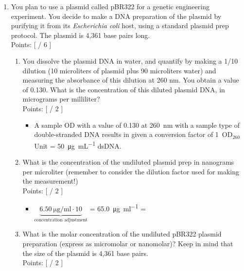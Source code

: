 \documentclass[basic]{inVerba-notes}
\begin{document}
\begin{enumerate}\color{minor}
  \item You plan to use a plasmid called pBR322 for a genetic engineering experiment. You decide to make a DNA preparation of the plasmid by purifying it from its \textit{Escherichia coli} host, using a standard plasmid prep protocol. The plasmid is 4,361 base pairs long. 
  \\ Points: [ \hspace{14pt} / 6 ] \smallskip
  \begin{enumerate}
    \item You dissolve the plasmid DNA in water, and quantify by making a 1/10 dilution (10 microliters of plasmid plus 90 microliters water) and measuring the absorbance of this dilution at 260 nm. You obtain a value of 0.130. What is the concentration of this diluted plasmid DNA, in micrograms per milliliter? 
    \\ Points: [ \hspace{14pt} / 2 ] \smallskip

    \begin{itemize}\color{text}
      \item A sample OD with a value of 0.130 at \SI{260}{nm} with a sample type of double-stranded DNA results in  given a conversion factor of 1~OD\(_{260}\) Unit = \SI{50}{\micro\gram\per\milli\liter} dsDNA\@.
    \end{itemize}
    \item What is the concentration of the undiluted plasmid prep in nanograms per microliter (remember to consider the dilution factor used for making the measurement!) 
    \\ Points: [ \hspace{14pt} / 2 ] \smallskip

    \begin{itemize}\color{text}
      \item \(\underbrace{\SI{6.50}{\micro\gram\per\milli\litre} \cdot 10}_{\text{concentration adjustment}}\) = \SI{65.0}{\micro\gram\per\milli\litre} = 
    \end{itemize}
    \item What is the molar concentration of the undiluted pBR322 plasmid preparation (express as micromolar or nanomolar)? Keep in mind that the size of the plasmid is 4,361 base pairs. 
    \\ Points: [ \hspace{14pt} / 2 ] \medskip


\end{enumerate}
\end{enumerate}
\end{document}

